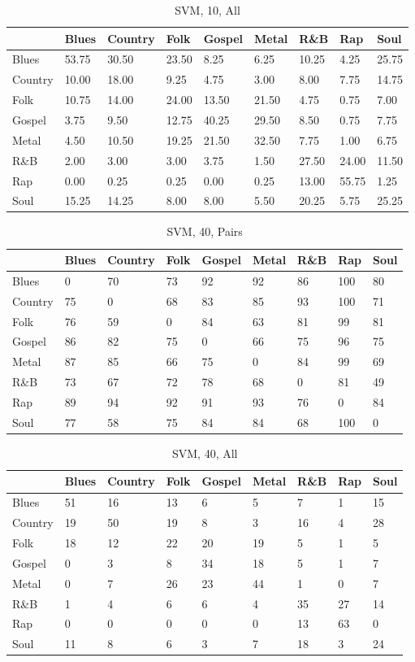 \documentclass[a4paper,oneside]{article}
\begin{document}
\begin{table}[H]
\caption{SVM, 10, All}
\begin{tabu}{l|*{8}{l}}
 & Blues & Country & Folk & Gospel & Metal & R\&B & Rap & Soul \\ \hline
Blues & 53.75 & 30.50 & 23.50 & 8.25 & 6.25 & 10.25 & 4.25 & 25.75 \\
Country & 10.00 & 18.00 & 9.25 & 4.75 & 3.00 & 8.00 & 7.75 & 14.75 \\
Folk & 10.75 & 14.00 & 24.00 & 13.50 & 21.50 & 4.75 & 0.75 & 7.00 \\
Gospel & 3.75 & 9.50 & 12.75 & 40.25 & 29.50 & 8.50 & 0.75 & 7.75 \\
Metal & 4.50 & 10.50 & 19.25 & 21.50 & 32.50 & 7.75 & 1.00 & 6.75 \\
R\&B & 2.00 & 3.00 & 3.00 & 3.75 & 1.50 & 27.50 & 24.00 & 11.50 \\
Rap & 0.00 & 0.25 & 0.25 & 0.00 & 0.25 & 13.00 & 55.75 & 1.25 \\
Soul & 15.25 & 14.25 & 8.00 & 8.00 & 5.50 & 20.25 & 5.75 & 25.25 \\
\end{tabu}
\end{table}

\begin{table}[H]
\caption{SVM, 40, Pairs}
\begin{tabu}{l|*{8}{l}}
 & Blues & Country & Folk & Gospel & Metal & R\&B & Rap & Soul \\ \hline
Blues & 0 & 70 & 73 & 92 & 92 & 86 & 100 & 80 \\
Country & 75 & 0 & 68 & 83 & 85 & 93 & 100 & 71 \\
Folk & 76 & 59 & 0 & 84 & 63 & 81 & 99 & 81 \\
Gospel & 86 & 82 & 75 & 0 & 66 & 75 & 96 & 75 \\
Metal & 87 & 85 & 66 & 75 & 0 & 84 & 99 & 69 \\
R\&B & 73 & 67 & 72 & 78 & 68 & 0 & 81 & 49 \\
Rap & 89 & 94 & 92 & 91 & 93 & 76 & 0 & 84 \\
Soul & 77 & 58 & 75 & 84 & 84 & 68 & 100 & 0
\end{tabu}
\end{table}

\begin{table}[H]
\caption{SVM, 40, All}
\begin{tabu}{l|*{8}{l}}
 & Blues & Country & Folk & Gospel & Metal & R\&B & Rap & Soul \\ \hline
Blues & 51 & 16 & 13 & 6 & 5 & 7 & 1 & 15 \\
Country & 19 & 50 & 19 & 8 & 3 & 16 & 4 & 28 \\
Folk & 18 & 12 & 22 & 20 & 19 & 5 & 1 & 5 \\
Gospel & 0 & 3 & 8 & 34 & 18 & 5 & 1 & 7 \\
Metal & 0 & 7 & 26 & 23 & 44 & 1 & 0 & 7 \\
R\&B & 1 & 4 & 6 & 6 & 4 & 35 & 27 & 14 \\
Rap & 0 & 0 & 0 & 0 & 0 & 13 & 63 & 0 \\
Soul & 11 & 8 & 6 & 3 & 7 & 18 & 3 & 24 \\
\end{tabu}
\end{table}
\end{document}
